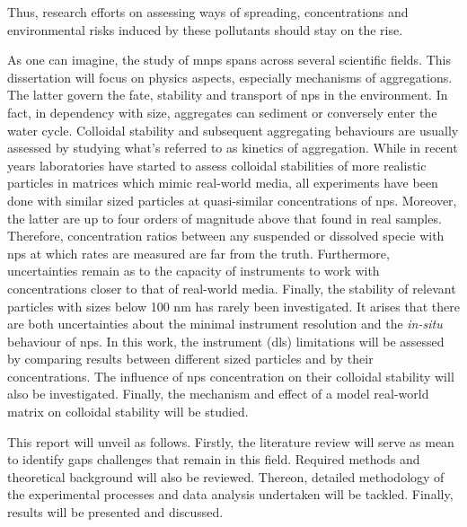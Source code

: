 Thus, research efforts on assessing ways of spreading, concentrations and environmental risks induced by these pollutants should stay on the rise. 

As one can imagine, the study of \glspl{mnp} spans across several scientific fields. This dissertation will focus on physics aspects, especially mechanisms of aggregations. The latter govern the fate, stability and transport of \glspl{np} in the environment. In fact, in dependency with size, aggregates can sediment or conversely enter the water cycle. Colloidal stability and subsequent aggregating behaviours are usually assessed by studying what's referred to as kinetics of aggregation. While in recent years laboratories have started to assess colloidal stabilities of more realistic particles in matrices which mimic real-world media, all experiments have been done with similar sized particles at quasi-similar concentrations of \glspl{np}. Moreover, the latter are up to four orders of magnitude above that found in real samples.\autocite{yang2025} Therefore, concentration ratios between any suspended or dissolved specie with \glspl{np} at which rates are measured are far from the truth. Furthermore, uncertainties remain as to the capacity of instruments to work with concentrations closer to that of real-world media. Finally, the stability of relevant particles with sizes below 100 nm has rarely been investigated. 
It arises that there are both uncertainties about the minimal instrument resolution and the \textit{in-situ} behaviour of \glspl{np}.
In this work, the instrument (\gls{dls}) limitations will be assessed by comparing results between different sized particles and by their concentrations. The influence of \glspl{np} concentration on their colloidal stability will also be investigated. Finally, the mechanism and effect of a model real-world matrix on colloidal stability will be studied. 	  

This report will unveil as follows. Firstly, the literature review will serve as mean to identify gaps challenges that remain in this field. Required methods and theoretical background will also be reviewed. Thereon, detailed methodology of the experimental processes and data analysis undertaken will be tackled. Finally, results will be presented and discussed.  



